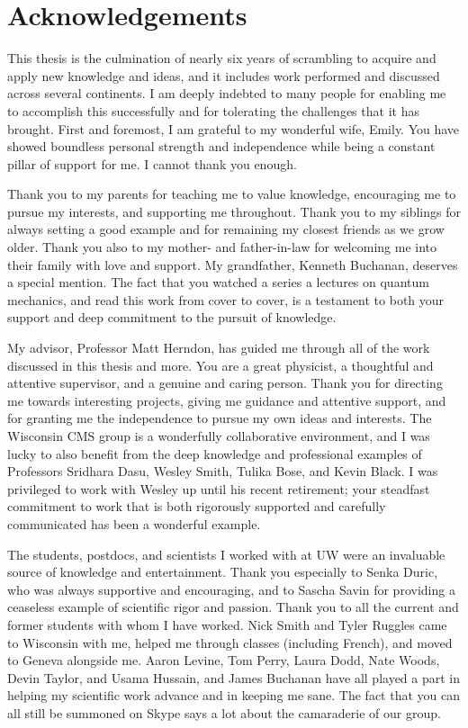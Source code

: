 \section{Acknowledgements}

This thesis is the culmination of nearly six years 
of scrambling to acquire and apply new knowledge and ideas,
and it includes work performed and discussed across several continents. 
I am deeply indebted to many people for enabling me to accomplish this
successfully and for tolerating the challenges that it has brought.
First and foremost, I am grateful
to my wonderful wife, Emily. You have showed boundless
personal strength and independence while being a constant pillar of 
support for me. I cannot thank you enough.

Thank you to my parents for teaching me to value knowledge,
encouraging me to pursue my interests, and supporting me throughout. Thank
you to my siblings for always setting a good example and for remaining 
my closest friends as we grow older.
Thank you also to my mother- and father-in-law for welcoming me into their family with love and support.
My grandfather, Kenneth Buchanan, deserves a special mention. 
The fact that you watched a series a lectures on quantum mechanics, 
and read this work from cover to cover, is a testament to both your support
and deep commitment to the pursuit of knowledge.

My advisor, Professor Matt Herndon, has guided me through all of the work discussed
in this thesis and more.
You are a great physicist, a thoughtful and attentive supervisor,
and a genuine and caring person. Thank you for directing me towards interesting
projects, giving me guidance and attentive support, and for 
granting me the independence to pursue my own ideas and interests.
The Wisconsin CMS group is a wonderfully collaborative environment,
and I was lucky to also benefit from the deep knowledge and professional examples
of Professors Sridhara Dasu, Wesley Smith, Tulika Bose, and Kevin Black. 
I was privileged to work with Wesley up until his recent retirement;
your steadfast commitment to work that is both rigorously
supported and carefully communicated has been a wonderful example.

The students, postdocs, and scientists I worked with at UW were an invaluable 
source of knowledge and entertainment. 
Thank you especially to Senka Duric, who was always supportive and
encouraging, and to 
Sascha Savin for providing a ceaseless example of scientific
rigor and passion.  
Thank you to all the current and former students with whom I have worked.
Nick Smith and Tyler Ruggles came to Wisconsin with me, 
helped me through classes (including French), and moved to Geneva
alongside me. Aaron Levine, Tom Perry, Laura Dodd, Nate Woods, Devin Taylor,
and Usama Hussain, and James Buchanan have all played a part in helping my
scientific work advance and in keeping me sane. The fact that you can all
still be summoned on Skype says a lot about the camaraderie of our group.

